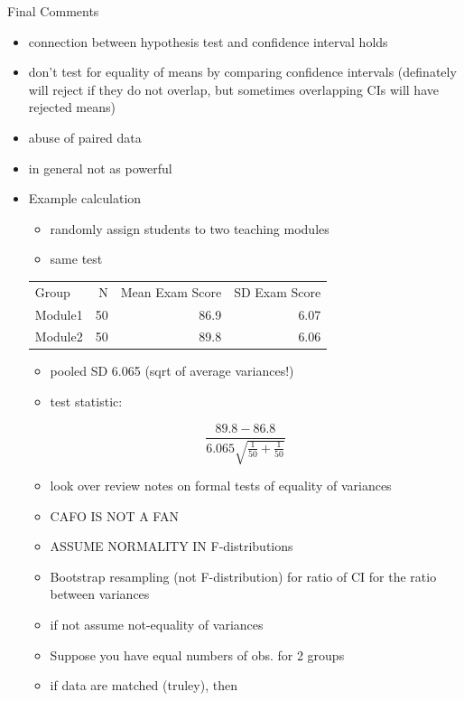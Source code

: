 \documentclass[11pt]{article}
\begin{document}
Final Comments
\begin{itemize}
\item connection between hypothesis test and confidence interval holds
\item don't test for equality of means by comparing confidence intervals
  (definately will reject if they do not overlap, but sometimes
  overlapping CIs will have rejected means)
\item abuse of paired data
\item in general not as powerful
\end{itemize}
\begin{itemize}

\item Example calculation
\label{sec-1-4-3-1}%
\begin{itemize}
\item randomly assign students to two teaching modules
\item same test
\end{itemize}



\begin{center}
\begin{tabular}{lrrr}
 Group    &   N  &  Mean Exam Score  &  SD Exam Score  \\
 Module1  &  50  &             86.9  &           6.07  \\
 Module2  &  50  &             89.8  &           6.06  \\
\end{tabular}
\end{center}



\begin{itemize}
\item pooled SD 6.065 (sqrt of average variances!)
\item test statistic:
\end{itemize}

$$ \frac{89.8-86.8}{6.065\sqrt{\frac{1}{50}+\frac{1}{50}}} $$

\begin{itemize}
\item look over review notes on formal tests of equality of variances
\item CAFO IS NOT A FAN
\item ASSUME NORMALITY IN F-distributions
\item Bootstrap resampling (not F-distribution) for ratio of CI for the
  ratio between variances
\item if not assume not-equality of variances
\item Suppose you have equal numbers of obs. for 2 groups
\item if data are matched (truley), then
\end{itemize}


\end{itemize}
\end{document}
